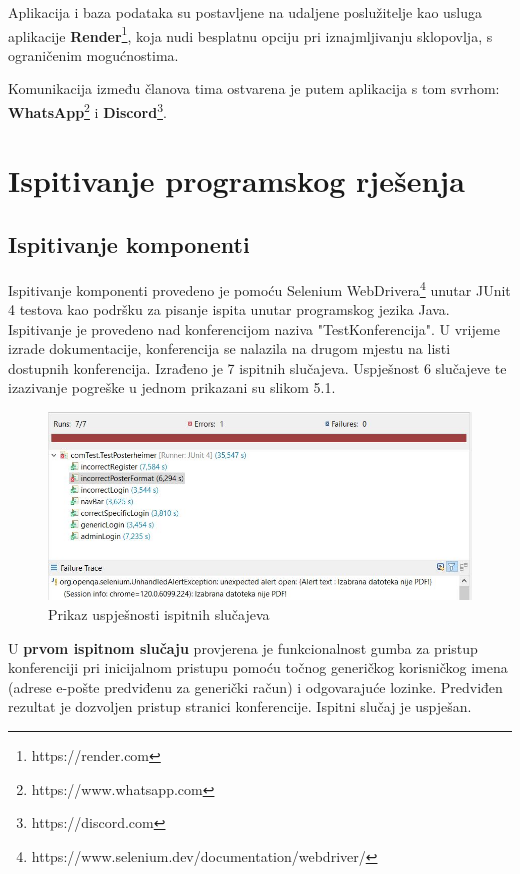 			Aplikacija i baza podataka su postavljene na udaljene poslužitelje kao usluga aplikacije \textbf{Render}\footnote{https://render.com}, koja nudi besplatnu opciju pri iznajmljivanju sklopovlja, s ograničenim mogućnostima.
			
			Komunikacija između članova tima ostvarena je putem aplikacija s tom svrhom: \textbf{WhatsApp}\footnote{https://www.whatsapp.com} i \textbf{Discord}\footnote{https://discord.com}.
			
			\eject 
		
	
		\section{Ispitivanje programskog rješenja}	 
			
			\subsection{Ispitivanje komponenti}
			
			Ispitivanje komponenti provedeno je pomoću Selenium WebDrivera\footnote{https://www.selenium.dev/documentation/webdriver/} unutar JUnit 4 testova kao podršku za pisanje ispita unutar programskog jezika Java. Ispitivanje je provedeno nad konferencijom naziva "TestKonferencija". U vrijeme izrade dokumentacije, konferencija se nalazila na drugom mjestu na listi dostupnih konferencija. 
			Izrađeno je 7 ispitnih slučajeva. Uspješnost 6 slučajeve te izazivanje pogreške u jednom prikazani su slikom 5.1.
			
			\begin{figure} [hbt!]
				\includegraphics[width=\linewidth]{Slike/testResults}
				\caption{Prikaz uspješnosti ispitnih slučajeva}
			\end{figure}
			
			\newpage
			
			U \textbf{prvom ispitnom slučaju} provjerena je funkcionalnost gumba za pristup konferenciji pri inicijalnom pristupu pomoću točnog generičkog korisničkog imena (adrese e-pošte predviđenu za generički račun) i odgovarajuće lozinke. Predviđen rezultat je dozvoljen pristup stranici konferencije. Ispitni slučaj je uspješan.
			
